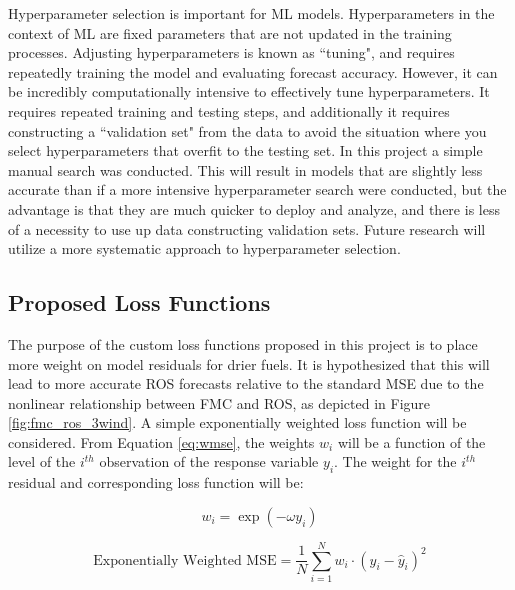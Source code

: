 \documentclass[11pt]{article}%
\begin{document}
Hyperparameter selection is important for ML models. Hyperparameters in the context of ML are fixed parameters that are not updated in the training processes. Adjusting hyperparameters is known as ``tuning", and requires repeatedly training the model and evaluating forecast accuracy. However, it can be incredibly computationally intensive to effectively tune hyperparameters. It requires repeated training and testing steps, and additionally it requires constructing a ``validation set" from the data to avoid the situation where you select hyperparameters that overfit to the testing set. In this project a simple manual search was conducted. This will result in models that are slightly less accurate than if a more intensive hyperparameter search were conducted, but the advantage is that they are much quicker to deploy and analyze, and there is less of a necessity to use up data constructing validation sets. Future research will utilize a more systematic approach to hyperparameter selection. 

\subsection{Proposed Loss Functions}

The purpose of the custom loss functions proposed in this project is to place more weight on model residuals for drier fuels. It is hypothesized that this will lead to more accurate ROS forecasts relative to the standard MSE due to the nonlinear relationship between FMC and ROS, as depicted in Figure \ref{fig:fmc_ros_3wind}. A simple exponentially weighted loss function will be considered. From Equation \ref{eq:wmse}, the weights $w_i$ will be a function of the level of the $i^{th}$ observation of the response variable $y_i$. The weight for the $i^{th}$ residual and corresponding loss function will be:

\begin{equation}
    \label{eq:weights}
    w_i = \exp(-\omega y_i)
\end{equation}

\begin{equation}
    \label{eq:wloss}
    \text{Exponentially Weighted MSE} = \frac{1}{N}\sum_{i=1}^N w_i\cdot (y_i - \hat y_i)^2
\end{equation}
\end{document}
